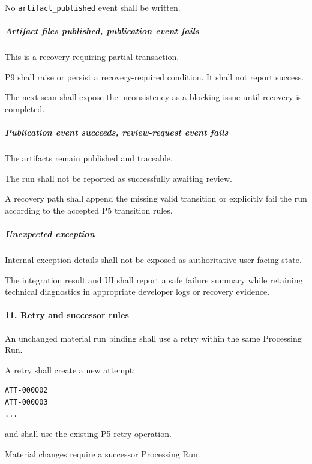 No \texttt{artifact\_published} event shall be written.

\hypertarget{artifact-files-published-publication-event-fails}{%
\subparagraph{Artifact files published, publication event fails}\label{artifact-files-published-publication-event-fails}}

This is a recovery-requiring partial transaction.

P9 shall raise or persist a recovery-required condition. It shall not report success.

The next scan shall expose the inconsistency as a blocking issue until recovery is completed.

\hypertarget{publication-event-succeeds-review-request-event-fails}{%
\subparagraph{Publication event succeeds, review-request event fails}\label{publication-event-succeeds-review-request-event-fails}}

The artifacts remain published and traceable.

The run shall not be reported as successfully awaiting review.

A recovery path shall append the missing valid transition or explicitly fail the run according to the accepted P5 transition rules.

\hypertarget{unexpected-exception}{%
\subparagraph{Unexpected exception}\label{unexpected-exception}}

Internal exception details shall not be exposed as authoritative user-facing state.

The integration result and UI shall report a safe failure summary while retaining technical diagnostics in appropriate developer logs or recovery evidence.

\hypertarget{11-retry-and-successor-rules}{%
\paragraph{11. Retry and successor rules}\label{11-retry-and-successor-rules}}

An unchanged material run binding shall use a retry within the same Processing Run.

A retry shall create a new attempt:

\begin{verbatim}
ATT-000002
ATT-000003
...
\end{verbatim}

and shall use the existing P5 retry operation.

Material changes require a successor Processing Run.

